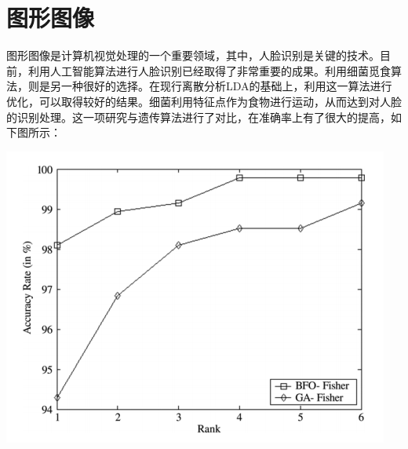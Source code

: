 \documentclass{article}
\begin{document}
\section{图形图像}
图形图像是计算机视觉处理的一个重要领域，其中，人脸识别是关键的技术。目前，利用人工智能算法进行人脸识别已经取得了非常重要的成果。利用细菌觅食算法，则是另一种很好的选择。在现行离散分析LDA的基础上，利用这一算法进行优化，可以取得较好的结果。细菌利用特征点作为食物进行运动，从而达到对人脸的识别处理。这一项研究与遗传算法进行了对比，在准确率上有了很大的提高\cite{ref4}，如下图所示：
\begin{center}
\includegraphics[scale=1]{face.png}
\end{center}
\end{document}
